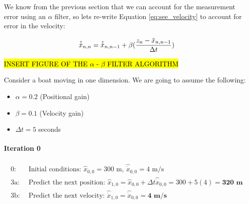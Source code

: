         We know from the previous section that we can account for the measurement error using an $\alpha$ filter, so lets re-write Equation \ref{eq:see_velocity} to account for error in the velocity:

        \begin{equation}
            \labeq{see_velocity_b}
            \hat{\dot{x}}_{n,n} = \hat{\dot{x}}_{n,n-1} + \beta(\frac{z_n - \hat{x}_{n,n-1}}{\Delta t})
        \end{equation}

        \hl{INSERT FIGURE OF THE $\alpha$ - $\beta$ FILTER ALGORITHM}


        \begin{example} \label{ex:alpha_beta_filter}
        Consider a boat moving in one dimension. 
        We are going to assume the following:
        \begin{itemize}
            \item $\alpha = 0.2$ (Positional gain)
            \item $\beta = 0.1$ (Velocity gain)
            \item $\Delta t = 5$ seconds
        \end{itemize}

        \paragraph{Iteration 0}
        \begin{equation*}
            \begin{aligned} 
                0:& \text{ Initial conditions: } \hat{x}_{0,0} = 300 \text{ m, } \hat{\dot{x}}_{0,0} = 4 \text{ m/s} \\
                3\text{a}:& \text{ Predict the next position: } \hat{x}_{1,0} = \hat{x}_{0,0} + \Delta t \hat{\dot{x}}_{0,0} = 300 + 5(4) = \textbf{320 m} \\
                3\text{b}:& \text{ Predict the next velocity: } \hat{\dot{x}}_{1,0} = \hat{\dot{x}}_{0,0} = \textbf{4 m/s}
            \end{aligned}
        \end{equation*}
        

\end{example}

